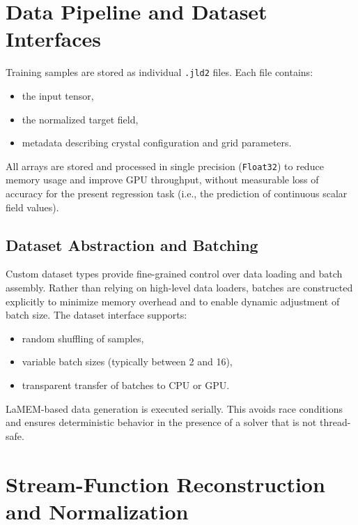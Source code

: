 \section{Data Pipeline and Dataset Interfaces}

Training samples are stored as individual \texttt{.jld2} files. Each file contains:
\begin{itemize}
    \item the input tensor,
    \item the normalized target field,
    \item metadata describing crystal configuration and grid parameters.
\end{itemize}

All arrays are stored and processed in single precision (\texttt{Float32}) to reduce memory usage and improve GPU throughput, without measurable loss of accuracy for the present regression task (i.e., the prediction of continuous scalar field values).

\subsection*{Dataset Abstraction and Batching}

Custom dataset types provide fine-grained control over data loading and batch assembly. Rather than relying on high-level data loaders, batches are constructed explicitly to minimize memory overhead and to enable dynamic adjustment of batch size. The dataset interface supports:
\begin{itemize}
    \item random shuffling of samples,
    \item variable batch sizes (typically between 2 and 16),
    \item transparent transfer of batches to CPU or GPU.
\end{itemize}

LaMEM-based data generation is executed serially. This avoids race conditions and ensures deterministic behavior in the presence of a solver that is not thread-safe.

\section{Stream-Function Reconstruction and Normalization}

